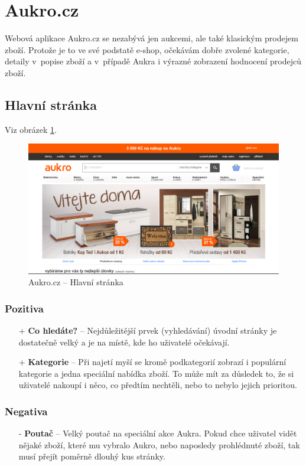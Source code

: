 \section{Aukro.cz}

\label{analyza:aukro}

Webová aplikace Aukro.cz \cite{aukro} se nezabývá jen aukcemi, ale také klasickým prodejem zboží. Protože je to ve své podstatě e-shop, očekávám dobře zvolené kategorie, detaily v~popise zboží a v~případě Aukra i výrazné zobrazení hodnocení prodejců zboží.

\subsection{Hlavní stránka}
Viz obrázek \ref{fig:aukro:home}.
\begin{figure}[h]
    \centering
    \includegraphics[width=1.0\textwidth]{media/aukro/home.png}
    \caption{Aukro.cz -- Hlavní stránka}
    \label{fig:aukro:home}
\end{figure}
\subsubsection*{Pozitiva}
\begin{itemize}
    \item[+] \textbf{Co hledáte?} -- Nejdůležitější prvek (vyhledávání) úvodní stránky je dostatečně velký a je na místě, kde ho uživatelé očekávají.
    \item[+] \textbf{Kategorie} -- Při najetí myší se kromě podkategorií zobrazí i populární kategorie a jedna speciální nabídka zboží. To může mít za důsledek to, že si uživatelé nakoupí i něco, co předtím nechtěli, nebo to nebylo jejich prioritou.
\end{itemize}
\subsubsection*{Negativa}
\begin{itemize}
    \item[-] \textbf{Poutač} -- Velký poutač na speciální akce Aukra. Pokud chce uživatel vidět nějaké zboží, které mu vybralo Aukro, nebo naposledy prohlédnuté zboží, tak musí přejít poměrně dlouhý kus stránky.
\end{itemize}


